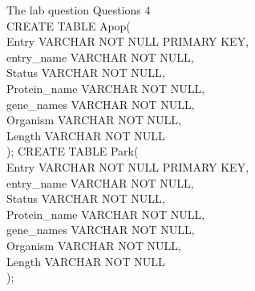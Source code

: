 \documentclass{report}
\begin{document}
\linespread{1.0}\selectfont
The lab question 
Questions 4\\
CREATE TABLE Apop(\\
Entry VARCHAR NOT NULL PRIMARY KEY,\\
entry\_name VARCHAR NOT NULL,\\
Status VARCHAR NOT NULL,\\
Protein\_name VARCHAR  NOT NULL,\\
gene\_names VARCHAR NOT NULL, \\
Organism VARCHAR NOT NULL,\\
Length   VARCHAR NOT NULL\\
);
CREATE TABLE Park(\\
Entry VARCHAR NOT NULL PRIMARY KEY,\\
entry\_name VARCHAR NOT NULL,\\
Status VARCHAR NOT NULL,\\
Protein\_name VARCHAR  NOT NULL,\\
gene\_names VARCHAR NOT NULL,\\
Organism VARCHAR NOT NULL,\\
Length   VARCHAR NOT NULL\\
);
\end{document}
